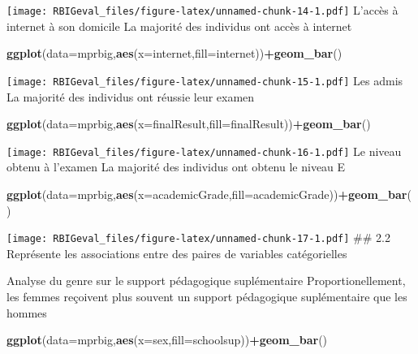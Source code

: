 \documentclass[
]{article}
\newenvironment{Shaded}{\begin{snugshade}}{\end{snugshade}}
\newcommand{\DataTypeTok}[1]{\textcolor[rgb]{0.13,0.29,0.53}{#1}}
\newcommand{\KeywordTok}[1]{\textcolor[rgb]{0.13,0.29,0.53}{\textbf{#1}}}
\newcommand{\NormalTok}[1]{#1}
\newcommand{\OperatorTok}[1]{\textcolor[rgb]{0.81,0.36,0.00}{\textbf{#1}}}
\begin{document}
\texttt{[image: RBIGeval\_files/figure-latex/unnamed-chunk-14-1.pdf]}
L'accès à internet à son domicile La majorité des individus ont accès à
internet

\begin{Shaded}
\begin{Highlighting}[]
\KeywordTok{ggplot}\NormalTok{(}\DataTypeTok{data=}\NormalTok{mprbig,}\KeywordTok{aes}\NormalTok{(}\DataTypeTok{x=}\NormalTok{internet,}\DataTypeTok{fill=}\NormalTok{internet))}\OperatorTok{+}\KeywordTok{geom_bar}\NormalTok{()}
\end{Highlighting}
\end{Shaded}

\texttt{[image: RBIGeval\_files/figure-latex/unnamed-chunk-15-1.pdf]} Les
admis La majorité des individus ont réussie leur examen

\begin{Shaded}
\begin{Highlighting}[]
\KeywordTok{ggplot}\NormalTok{(}\DataTypeTok{data=}\NormalTok{mprbig,}\KeywordTok{aes}\NormalTok{(}\DataTypeTok{x=}\NormalTok{finalResult,}\DataTypeTok{fill=}\NormalTok{finalResult))}\OperatorTok{+}\KeywordTok{geom_bar}\NormalTok{()}
\end{Highlighting}
\end{Shaded}

\texttt{[image: RBIGeval\_files/figure-latex/unnamed-chunk-16-1.pdf]} Le
niveau obtenu à l'examen La majorité des individus ont obtenu le niveau
E

\begin{Shaded}
\begin{Highlighting}[]
\KeywordTok{ggplot}\NormalTok{(}\DataTypeTok{data=}\NormalTok{mprbig,}\KeywordTok{aes}\NormalTok{(}\DataTypeTok{x=}\NormalTok{academicGrade,}\DataTypeTok{fill=}\NormalTok{academicGrade))}\OperatorTok{+}\KeywordTok{geom_bar}\NormalTok{()}
\end{Highlighting}
\end{Shaded}

\texttt{[image: RBIGeval\_files/figure-latex/unnamed-chunk-17-1.pdf]}
\#\# 2.2 Représente les associations entre des paires de variables
catégorielles

Analyse du genre sur le support pédagogique suplémentaire
Proportionellement, les femmes reçoivent plus souvent un support
pédagogique suplémentaire que les hommes

\begin{Shaded}
\begin{Highlighting}[]
\KeywordTok{ggplot}\NormalTok{(}\DataTypeTok{data=}\NormalTok{mprbig,}\KeywordTok{aes}\NormalTok{(}\DataTypeTok{x=}\NormalTok{sex,}\DataTypeTok{fill=}\NormalTok{schoolsup))}\OperatorTok{+}\KeywordTok{geom_bar}\NormalTok{()}
\end{Highlighting}
\end{Shaded}
\end{document}

